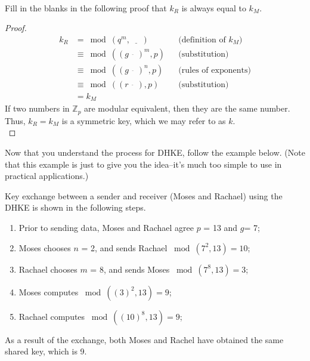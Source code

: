 \begin{exercise}\label{exercise:further_crypt:k1isk2}\\
Fill in the blanks in the following proof that  $k_R$ is always equal to  $k_M$.\\
  	\begin{proof} 
		\begin{align*} 
		k_R &=   \bmod (q^m , \underline{~~~~~~}) && \text{(definition of $k_M$)}
		\\&\equiv \bmod ((g^{\underline{~~~~~~}})^m , p) &&  \text{(substitution)}	
		\\&\equiv \bmod ((g^{\underline{~~~~~~}})^n , p) &&  \text{(rules of exponents)}
		\\&\equiv \bmod ((r^{\underline{~~~~~~}}) , p) &&  \text{(substitution)}		
		\\&= k_M
		\end{align*} 
   	If two numbers in $\mathbb{Z}_p$ are modular equivalent, then they are the same number. Thus, $k_R = k_M$ is a symmetric key, which we may refer to as $k$.\\

  	\end{proof}
\end{exercise}

Now that you understand the process for DHKE, follow the example below.  (Note that this example is just to give you the idea--it's much too simple to use in practical applications.)

 \begin{eg} Key exchange between a sender and receiver (Moses and Rachael) using the DHKE is shown in the following steps.
\begin{enumerate}[Step 1.]
\item Prior to sending data, Moses and Rachael agree $p$ = 13 and $g$= 7; 
\item Moses chooses $n$ = 2, and sends Rachael $\bmod (7^2 , 13) = 10$;
\item Rachael chooses $m$ = 8, and sends Moses $\bmod (7^8  , 13) = 3 $;
\item Moses computes $\bmod ((3)^2 , 13 ) = 9$;
\item Rachael computes $\bmod ((10)^8 , 13 ) = 9$;
\end{enumerate}
As a result of the exchange, both Moses and Rachel have obtained the same shared key, which is 9.
\end{eg}


